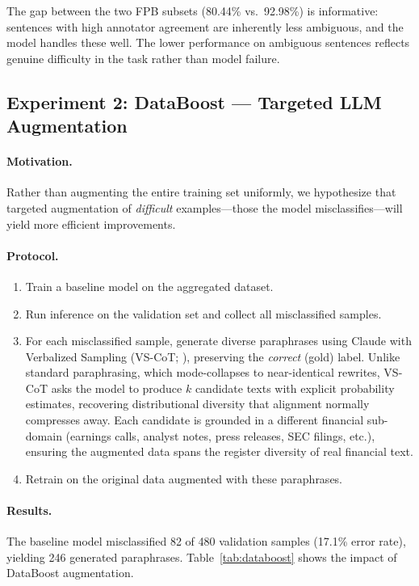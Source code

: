 \documentclass[11pt]{article}
\begin{document}
The gap between the two FPB subsets (80.44\% vs.\ 92.98\%) is informative: sentences with high annotator agreement are inherently less ambiguous, and the model handles these well. The lower performance on ambiguous sentences reflects genuine difficulty in the task rather than model failure.

\subsection{Experiment 2: DataBoost --- Targeted LLM Augmentation}
\label{sec:databoost}

\paragraph{Motivation.}
Rather than augmenting the entire training set uniformly, we hypothesize that targeted augmentation of \emph{difficult} examples---those the model misclassifies---will yield more efficient improvements.

\paragraph{Protocol.}
\begin{enumerate}[nosep]
    \item Train a baseline model on the aggregated dataset.
    \item Run inference on the validation set and collect all misclassified samples.
    \item For each misclassified sample, generate diverse paraphrases using Claude with Verbalized Sampling (VS-CoT; \citealt{zhang2025verbalized}), preserving the \emph{correct} (gold) label. Unlike standard paraphrasing, which mode-collapses to near-identical rewrites, VS-CoT asks the model to produce $k$ candidate texts with explicit probability estimates, recovering distributional diversity that alignment normally compresses away. Each candidate is grounded in a different financial sub-domain (earnings calls, analyst notes, press releases, SEC filings, etc.), ensuring the augmented data spans the register diversity of real financial text.
    \item Retrain on the original data augmented with these paraphrases.
\end{enumerate}

\paragraph{Results.}
The baseline model misclassified 82 of 480 validation samples (17.1\% error rate), yielding 246 generated paraphrases. Table~\ref{tab:databoost} shows the impact of DataBoost augmentation.
\end{document}
